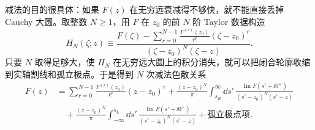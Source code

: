 减法的目的很具体：如果 $F(z)$ 在无穷远衰减得不够快，就不能直接丢掉 Cauchy 大圆。取整数 $N\ge1$，用 $F$ 在 $z_0$ 的前 $N$ 阶 Taylor 数据构造
\begin{equation}
 \boxed{
 H_N(\zeta;z)
 \equiv
 \frac{
 F(\zeta)-\displaystyle\sum_{r=0}^{N-1}
 \frac{F^{(r)}(z_0)}{r!}(\zeta-z_0)^r
 }
 {(\zeta-z_0)^N(\zeta-z)}.}
 \label{eq:subtracted-cauchy-kernel-dp68}
\end{equation}
只要 $N$ 取得足够大，使 $H_N$ 在无穷远大圆上的积分消失，就可以把闭合轮廓收缩到实轴割线和孤立极点。于是得到 $N$ 次减法色散关系
\begin{equation}
 \boxed{
 \begin{aligned}
 F(z)
 &=\sum_{r=0}^{N-1}
 \frac{F^{(r)}(z_0)}{r!}(z-z_0)^r
 +\frac{(z-z_0)^N}{\pi}
 \int_{s_R}^{\infty}\!\dd s'\,
 \frac{\operatorname{Im}F(s'+\ii0^+)}{(s'-z_0)^N(s'-z)}
 \\
 &\quad
 +\frac{(z-z_0)^N}{\pi}
 \int_{-\infty}^{s_L}\!\dd s'\,
 \frac{\operatorname{Im}F(s'+\ii0^+)}{(s'-z_0)^N(s'-z)}
 +\text{孤立极点项}.
 \end{aligned}}
 \label{eq:general-subtracted-dispersion-dp9}
\end{equation}

